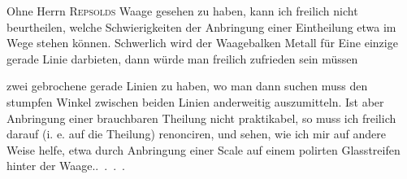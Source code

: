 Ohne Herrn \textsc{Repsolds} Waage gesehen zu haben, kann ich freilich nicht
beurtheilen, welche Schwierigkeiten der Anbringung einer Eintheilung etwa
im Wege stehen können. Schwerlich wird der Waagebalken Metall für Eine
einzige gerade Linie darbieten, dann würde man freilich zufrieden sein müssen
\begin{center}
\end{center}
\noindent zwei gebrochene gerade Linien zu haben, wo man dann suchen muss den
stumpfen Winkel zwischen beiden Linien anderweitig auszumitteln. Ist aber
Anbringung einer brauchbaren Theilung nicht praktikabel, so muss ich freilich
darauf (i. e. auf die Theilung) renonciren, und sehen, wie ich mir auf andere
Weise helfe, etwa durch Anbringung einer Scale auf einem polirten Glasstreifen
hinter der Waage.\quad .\ .\ .\ .
\clearpage\endgroup
